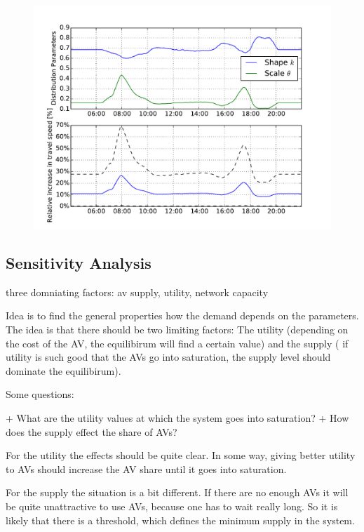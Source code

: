 \begin{figure}
    \centering
    \includegraphics[width=1.0\textwidth]{figures/randommodel.pdf}
    \caption{}
    \label{fig:randommodel}
\end{figure}

\subsection{Sensitivity Analysis}

three domniating factors: av supply, utility, network capacity


Idea is to find the general properties how the demand depends on the
parameters. The idea is that there should be two limiting factors: The utility (depending
on the cost of the AV, the equilibirum will find a certain value) and the supply (
if utility is such good that the AVs go into saturation, the supply level should
dominate the equilibirum).

Some questions:

+ What are the utility values at which the system goes into saturation?
+ How does the supply effect the share of AVs?

For the utility the effects should be quite clear. In some way, giving better
utility to AVs should increase the AV share until it goes into saturation.

For the supply the situation is a bit different. If there are no enough AVs it
will be quite unattractive to use AVs, because one has to wait really long. So
it is likely that there is a threshold, which defines the minimum supply in the
system.


